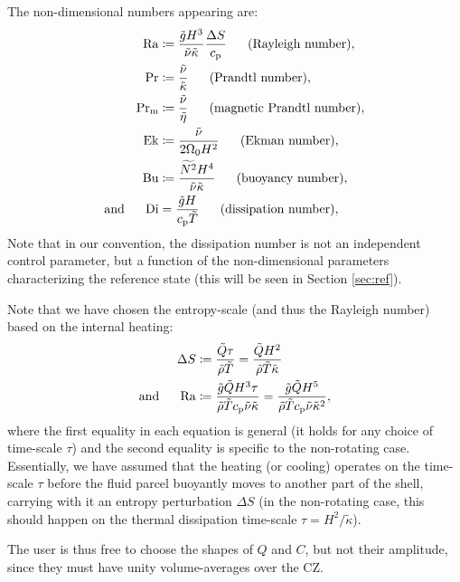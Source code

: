 \documentclass[12pt]{article}
\numberwithin{equation}{section}
\begin{document}
The non-dimensional numbers appearing are:
\begin{subequations}
\begin{align}
	{\rm{Ra}} &\coloneqq \frac{\tilde{g} H^3}{\tilde{\nu} \tilde{\kappa}} \frac{\Delta S}{c_{\rm{p}}}\ \ \ \ \ \text{(Rayleigh number)},\\ 
	{\rm{Pr}} &\coloneqq \frac{\tilde{\nu}}{\tilde{\kappa}}\ \ \ \ \ \text{(Prandtl number)},\\
	{\rm{Pr_m}} &\coloneqq \frac{\tilde{\nu}}{\tilde{\eta}}\ \ \ \ \ \text{(magnetic Prandtl number)},\\
	{\rm{Ek}} &\coloneqq \frac{\tilde{\nu}}{2\Omega_0H^2}\ \ \ \ \ \text{(Ekman number)},\\	
	{\rm{Bu}} &\coloneqq \frac{\widetilde{N^2}H^4}{\tilde{\nu}\tilde{\kappa}}\ \ \ \ \ \text{(buoyancy number)},\\
	\text{and}\ \ \ \ \  {\rm{Di}} &= \frac{\tilde{g}H}{c_{\rm{p}}\tilde{T}}\ \ \ \ \ \text{(dissipation number)},
\end{align}
\end{subequations}
Note that in our convention, the dissipation number is not an independent control parameter, but a function of the non-dimensional parameters characterizing the reference state (this will be seen in Section \ref{sec:ref}). 

Note that we have chosen the entropy-scale (and thus the Rayleigh number) based on the internal heating:
\begin{subequations}
\begin{align}
	\Delta S &\coloneqq \frac{\tilde{Q}\tau}{\tilde{\rho}\tilde{T}} = \frac{\tilde{Q}H^2}{\tilde{\rho}\tilde{T}\tilde{\kappa}}\label{eq:dsnonrot}\\
	\text{and}\ \ \ \ \  {\rm{Ra}} &\coloneqq \frac{\tilde{g} \tilde{Q} H^3\tau}{\tilde{\rho}\tilde{T}c_{\rm{p}}\tilde{\nu} \tilde{\kappa}} =  \frac{\tilde{g} \tilde{Q} H^5}{\tilde{\rho}\tilde{T}c_{\rm{p}}\tilde{\nu} \tilde{\kappa}^2},\label{eq:ranonrot}\\ 
\end{align}
\end{subequations}
where the first equality in each equation is general (it holds for any choice of time-scale $\tau$) and the second equality is specific to the non-rotating case. Essentially, we have assumed that the heating (or cooling) operates on the time-scale $\tau$ before the fluid parcel buoyantly moves to another part of the shell, carrying with it an entropy perturbation $\Delta S$ (in the non-rotating case, this should happen on the thermal dissipation time-scale $\tau=H^2/\tilde{\kappa}$). 

The user is thus free to choose the shapes of $Q$ and $C$, but not their amplitude, since they must have unity volume-averages over the CZ. 
\end{document}
